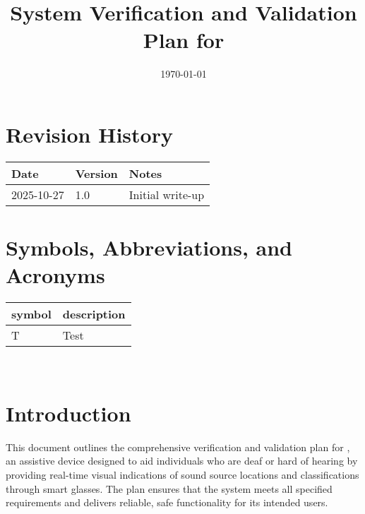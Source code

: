 \documentclass[12pt, titlepage]{article}
\begin{document}
\title{System Verification and Validation Plan for \progname{}} 
\author{\authname}
\date{\today}
	
\maketitle




\section*{Revision History}

\begin{tabularx}{\textwidth}{|p{3cm}|p{2cm}|X|}
\hline
{\bf Date} & {\bf Version} & {\bf Notes}\\
\hline
2025-10-27 & 1.0 & Initial write-up\\
\hline
\end{tabularx}

\newpage

\tableofcontents


\newpage

\section{Symbols, Abbreviations, and Acronyms}

\renewcommand{\arraystretch}{1.2}
\begin{tabular}{|l|l|} 
  \hline	
  \textbf{symbol} & \textbf{description}\\
  \hline
  T & Test\\
  \hline
\end{tabular}\\


\newpage


\section{Introduction}

This document outlines the comprehensive verification and validation plan for
\progname{}, an assistive device designed to aid individuals who are deaf or
hard of hearing by providing real-time visual indications of sound source
locations and classifications through smart glasses. The plan ensures that the
system meets all specified requirements and delivers reliable, safe
functionality for its intended users.
\end{document}
